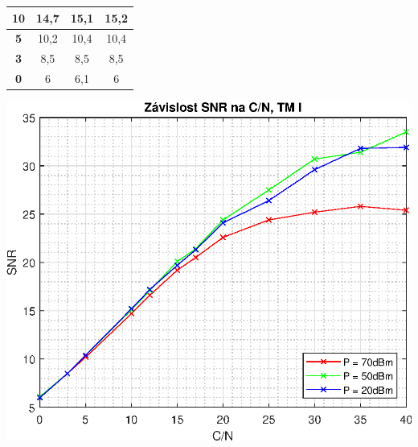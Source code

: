 \documentclass[10pt, a4paper]{article}%
\begin{document}
\begin{table}[ht!]
\begin{minipage}{0.5\textwidth}
{\begin{tabular}{|cccc|}
    \multicolumn{1}{|c|}{\textbf{10}}      & \multicolumn{1}{c|}{14,7}            & \multicolumn{1}{c|}{15,1}            & 15,2            \\ \hline
    \multicolumn{1}{|c|}{\textbf{5}}       & \multicolumn{1}{c|}{10,2}            & \multicolumn{1}{c|}{10,4}            & 10,4            \\ \hline
    \multicolumn{1}{|c|}{\textbf{3}}       & \multicolumn{1}{c|}{8,5}             & \multicolumn{1}{c|}{8,5}             & 8,5             \\ \hline
    \multicolumn{1}{|c|}{\textbf{0}}       & \multicolumn{1}{c|}{6}               & \multicolumn{1}{c|}{6,1}             & 6               \\ \hline
    \end{tabular}%
    }
\end{minipage}
\hfill
\begin{minipage}{0.45\textwidth}
    \centering
    \includegraphics[width=1\textwidth]{SNR_CN.eps}
\end{minipage}

\end{table}
\end{document}
